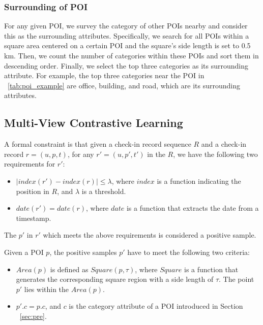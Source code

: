     \subsubsection{Surrounding of POI}
    For any given POI, we survey the category of other POIs nearby and consider this as the surrounding attributes. Specifically,  we search for all POIs within a square area centered on a certain POI and the square's side length is set to 0.5 km. Then, we count the number of categories within these POIs and sort them in descending order. Finally, we select the top three categories as its surrounding attribute. For example, the top three categories near the POI in \tableautorefname~\ref{tab:poi_example} are office, building, and road, which are its surrounding attributes.

\subsection{Multi-View Contrastive Learning}

    A formal constraint is that given a check-in record sequence $R$ and a check-in record $r=(u,p,t)$, for any $r'=(u,p',t')$ in the $R$, we have the following two requirements for $r'$:
    \begin{itemize}
        \item $|index(r') - index(r)| \leq \lambda$, where $index$ is a function indicating the position in $R$, and $\lambda$ is a threshold.
        \item $date(r') = date(r)$, where $date$ is a function that extracts the date from a timestamp.
    \end{itemize}

    The $p'$ in $r'$ which meets the above requirements is considered a positive sample.  

    Given a POI $p$, the positive samples $p'$ have to meet the following two criteria:
    \begin{itemize}
        \item $Area(p)$ is defined as $Square(p, \tau)$, where $Square$ is a function that generates the corresponding square region with a side length of $\tau$. The point $p'$ lies within the $Area(p)$.
        \item $p'.c=p.c$, and $c$ is the category attribute of a POI introduced in Section ~\ref{sec:pre}.
    \end{itemize}

